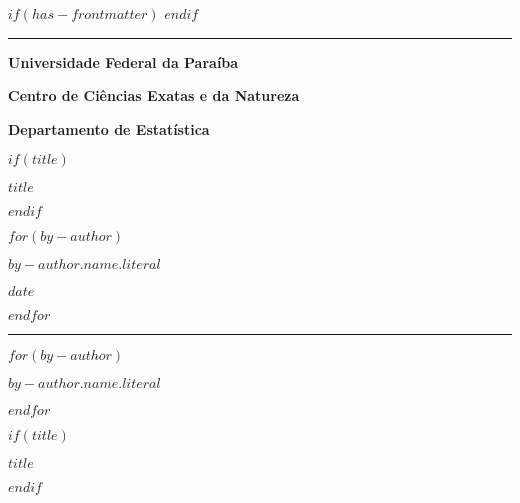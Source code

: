 $if(has-frontmatter)$
\scrreprt
$endif$
\cleardoublepage
\thispagestyle{empty}
{\centering
\noindent\rule{\textwidth}{0.5pt}

\vspace{2ex}

{\Large\bfseries Universidade Federal da Paraíba \par}
\vspace{1ex}
{\Large\bfseries Centro de Ciências Exatas e da Natureza \par}
\vspace{1ex}
{\Large\bfseries Departamento de Estatística \par}

\vfill

$if(title)$
{\large\bfseries $title$ \par}
$endif$

\vfill

$for(by-author)$
{\large $by-author.name.literal$ \par}
\vfill
{\normalsize $date$ \par}
$endfor$


\noindent\rule{\textwidth}{0.5pt}

\newpage

$for(by-author)$
{\normalsize\bfseries $by-author.name.literal$ \par}
$endfor$

$if(title)$
{\large\bfseries $title$ \par}
$endif$

}
